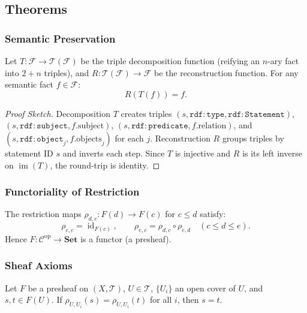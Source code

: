 \subsection{Theorems}
\label{sec:theorems}

\subsubsection{Semantic Preservation}
\label{sec:thm:preservation}

\begin{theorem}
\label{thm:preservation}
Let $T: \mathcal{F} \to \mathcal{T}(\mathcal{F})$ be the triple decomposition
function (reifying an $n$-ary fact into $2+n$ triples), and
$R: \mathcal{T}(\mathcal{F}) \to \mathcal{F}$ be the reconstruction function.
For any semantic fact $f \in \mathcal{F}$:
\[
R(T(f)) = f.
\]
\end{theorem}

\begin{proof}[Proof Sketch]
Decomposition $T$ creates triples $(s, \mathtt{rdf:type}, \mathtt{rdf:Statement})$,
$(s, \mathtt{rdf:subject}, f.\text{subject})$, $(s, \mathtt{rdf:predicate}, f.\text{relation})$,
and $(s, \mathtt{rdf:object}_j, f.\text{objects}_j)$ for each $j$.
Reconstruction $R$ groups triples by statement ID $s$ and inverts each step.
Since $T$ is injective and $R$ is its left inverse on $\operatorname{im}(T)$,
the round-trip is identity.
\end{proof}

\subsubsection{Functoriality of Restriction}

\begin{theorem}
\label{thm:restriction}
The restriction maps $\rho_{d,c}: F(d) \to F(c)$ for $c \leq d$ satisfy:
\[
\rho_{c,c} = \operatorname{id}_{F(c)}, \qquad
\rho_{e,c} = \rho_{d,c} \circ \rho_{e,d} \quad (c \leq d \leq e).
\]
Hence $F: \mathcal{C}^{\mathrm{op}} \to \mathbf{Set}$ is a functor (a presheaf).
\end{theorem}

\subsubsection{Sheaf Axioms}

\begin{theorem}[Locality]
\label{thm:locality}
Let $F$ be a presheaf on $(X, \mathcal{T})$, $U \in \mathcal{T}$,
$\{U_i\}$ an open cover of $U$, and $s, t \in F(U)$.
If $\rho_{U,U_i}(s) = \rho_{U,U_i}(t)$ for all $i$, then $s = t$.
\end{theorem}

